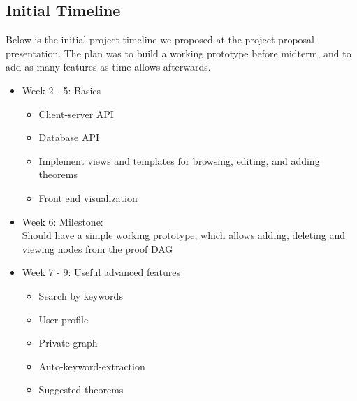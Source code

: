 \documentclass{acm_proc_article-sp}
\begin{document}
\subsection{Initial Timeline}
Below is the initial project timeline we proposed at the project proposal presentation. The plan was to build a working prototype before midterm, and to add as many features as time allows afterwards.  
\begin{itemize}
\item Week 2 - 5: Basics
\begin{itemize}
\item Client-server API
\item Database API
\item Implement views and templates for browsing, editing, and adding theorems
\item Front end visualization
\end{itemize}
\item Week 6: Milestone:\\
Should have a simple working prototype, which allows adding, deleting and viewing nodes from the proof DAG
\item Week 7 - 9: Useful advanced features
\begin{itemize}
\item Search by keywords
\item User profile
\item Private graph
\item Auto-keyword-extraction
\item Suggested theorems
\end{itemize}
\end{itemize}
\end{document}

